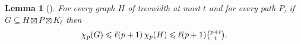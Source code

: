 \documentclass{patmorin}
\theoremstyle{plain}
\newtheorem{lem}[thm]{Lemma}
\theoremstyle{definition}
\newcommand{\note}[2]{\noindent{\color{red}[#1:~#2]}}
\newcommand{\referee}[2]{\noindent\textcolor{blue}{\framebox{\begin{minipage}{\textwidth} Ref \#{#1}: #2\end{minipage}}}}
\newcommand{\PP}{\mathcal{P}}
\renewcommand{\ge}{\geqslant}
\renewcommand{\le}{\leqslant}
\renewcommand{\leq}{\leqslant}
\begin{document}
\begin{lem}[\citep{DFMS21,PS21}]
\label{p-centered}
For every graph $H$ of treewidth at most $t$ and for every path $P$, if $G\subseteq H\boxtimes P \boxtimes K_\ell$ then
\[\chi_p(G)\le \ell (p+1)\, \chi_p(H) \leq \ell (p+1) \tbinom{p+t}{t}.\]
\end{lem}


%
%
%
\end{document}
